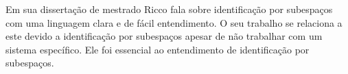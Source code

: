 Em sua dissertação de mestrado Ricco \cite{ricco2012} fala sobre identificação por subespaços com uma linguagem clara e de fácil entendimento. O seu trabalho se relaciona a este devido a identificação por subespaços apesar de não trabalhar com um sistema específico. Ele foi essencial ao entendimento de identificação por subespaços.


















